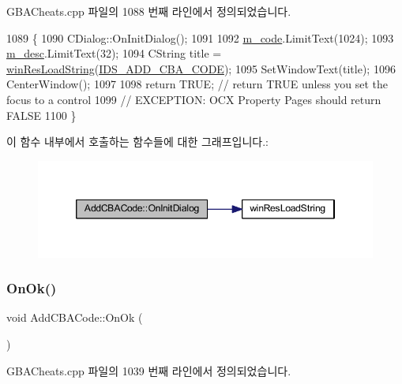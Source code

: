 G\+B\+A\+Cheats.\+cpp 파일의 1088 번째 라인에서 정의되었습니다.


\begin{DoxyCode}
1089 \{
1090   CDialog::OnInitDialog();
1091   
1092   \mbox{\hyperlink{class_add_c_b_a_code_ab4b404e9aed23e5dd265f543e98c9c6c}{m\_code}}.LimitText(1024);
1093   \mbox{\hyperlink{class_add_c_b_a_code_ab5056f88f9c1f58a20a1ce718599305b}{m\_desc}}.LimitText(32);
1094   CString title = \mbox{\hyperlink{_win_res_util_8cpp_a416e85e80ab9b01376e87251c83d1a5a}{winResLoadString}}(\mbox{\hyperlink{resource_8h_add1ed8080a9328ce15770b3f9bd29b09}{IDS\_ADD\_CBA\_CODE}});
1095   SetWindowText(title);
1096   CenterWindow();
1097   
1098   \textcolor{keywordflow}{return} TRUE;  \textcolor{comment}{// return TRUE unless you set the focus to a control}
1099                 \textcolor{comment}{// EXCEPTION: OCX Property Pages should return FALSE}
1100 \}
\end{DoxyCode}
이 함수 내부에서 호출하는 함수들에 대한 그래프입니다.\+:
\nopagebreak
\begin{figure}[H]
\begin{center}
\leavevmode
\includegraphics[width=346pt]{class_add_c_b_a_code_a302c75c08dacdd95eecff6b3b74ebbe6_cgraph}
\end{center}
\end{figure}
\mbox{\label{class_add_c_b_a_code_a63c5cc95366a1a0aad123432054f977a}} 
\subsubsection{\texorpdfstring{On\+Ok()}{OnOk()}}
{\footnotesize\ttfamily void Add\+C\+B\+A\+Code\+::\+On\+Ok (\begin{DoxyParamCaption}{ }\end{DoxyParamCaption})\hspace{0.3cm}{\ttfamily [protected]}}



G\+B\+A\+Cheats.\+cpp 파일의 1039 번째 라인에서 정의되었습니다.


